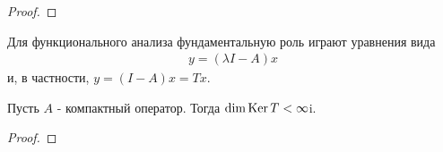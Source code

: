 \begin{proof}
    \todo
\end{proof}

Для функционального анализа фундаментальную роль играют уравнения вида 
\begin{gather}
    y = (\lambda I - A)x
\end{gather}
и, в частности, $y = (I - A)x = Tx$. 


\begin{statement}
    Пусть $A$ - компактный оператор. Тогда $\dim \operatorname{Ker} T < \infty$i.
\end{statement}

\begin{proof}
    
\end{proof}
